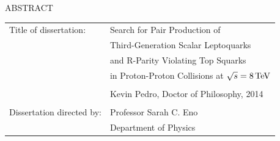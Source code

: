 \documentclass[12pt]{thesis}  %
\renewcommand{\baselinestretch}{2}
\begin{document}


\renewcommand{\baselinestretch}{1}
\small \normalsize

\begin{center}
\large{{ABSTRACT}} 

\vspace{2em} 

\end{center}

\begin{singlespace}

\noindent
\begin{tabular}{@{}ll}
Title of dissertation:    & {\large  Search for Pair Production of}\\
                          & {\large  Third-Generation Scalar Leptoquarks} \\
                          & {\large  and R-Parity Violating Top Squarks} \\
                          & {\large  in Proton-Proton Collisions at $\sqrt{s} = 8\,\text{Te\hspace{-.08em}V}$} \\
                          & \\
                          & {\large  Kevin Pedro, Doctor of Philosophy, 2014} \\
                          & \\
Dissertation directed by: & {\large  Professor Sarah C. Eno} \\
                          & {\large  Department of Physics } \\
\end{tabular}

\end{singlespace}

\vspace{2em}

\renewcommand{\baselinestretch}{2}
\large \normalsize
\end{document}
